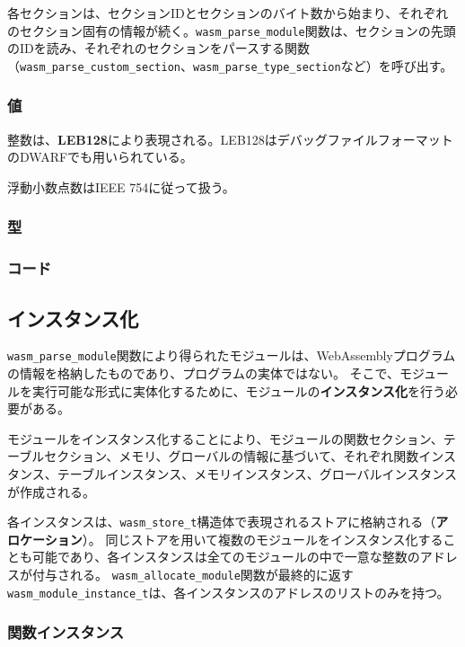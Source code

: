 各セクションは、セクションIDとセクションのバイト数から始まり、それぞれのセクション固有の情報が続く。\verb|wasm_parse_module|関数は、セクションの先頭のIDを読み、それぞれのセクションをパースする関数（\verb|wasm_parse_custom_section|、\verb|wasm_parse_type_section|など）を呼び出す。

\subsubsection{値}

整数は、{\bf LEB128}により表現される。LEB128はデバッグファイルフォーマットのDWARFでも用いられている\cite{dwarf}。

浮動小数点数はIEEE 754\cite{ieee754}に従って扱う。

\subsubsection{型}

\subsubsection{コード}

\subsection{インスタンス化}

\verb|wasm_parse_module|関数により得られたモジュールは、WebAssemblyプログラムの情報を格納したものであり、プログラムの実体ではない。
そこで、モジュールを実行可能な形式に実体化するために、モジュールの{\bf インスタンス化}を行う必要がある。

モジュールをインスタンス化することにより、モジュールの関数セクション、テーブルセクション、メモリ、グローバルの情報に基づいて、それぞれ関数インスタンス、テーブルインスタンス、メモリインスタンス、グローバルインスタンスが作成される。

各インスタンスは、\verb|wasm_store_t|構造体で表現されるストアに格納される（{\bf アロケーション}）。
同じストアを用いて複数のモジュールをインスタンス化することも可能であり、各インスタンスは全てのモジュールの中で一意な整数のアドレスが付与される。
\verb|wasm_allocate_module|関数が最終的に返す\verb|wasm_module_instance_t|は、各インスタンスのアドレスのリストのみを持つ。

\subsubsection{関数インスタンス}

